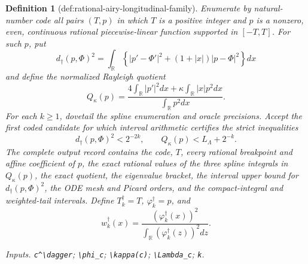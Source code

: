 \documentclass{article}
\newtheorem{definition}{Definition}
\begin{document}
\begin{definition}[def:rational-airy-longitudinal-family]
Enumerate by natural-number code all pairs \((T,p)\) in which \(T\) is a positive integer and \(p\) is a nonzero, even, continuous rational piecewise-linear function supported in \([-T,T]\).  For such \(p\), put
\[
d_\dagger(p,\Phi)^2=
\int_{\mathbb R}\left\{|p'-\Phi'|^2+(1+|x|)|p-\Phi|^2\right\}dx
\]
and define the normalized Rayleigh quotient
\[
Q_\kappa(p)=
\frac{4\int_{\mathbb R}|p'|^2dx+
\kappa\int_{\mathbb R}|x|p^2dx}
{\int_{\mathbb R}p^2dx}.
\]
For each \(k\ge1\), dovetail the spline enumeration and oracle precisions.  Accept the first coded candidate for which interval arithmetic certifies the strict inequalities
\[
d_\dagger(p,\Phi)^2<2^{-2k},
\qquad Q_\kappa(p)<L_\Lambda+2^{-k}.
\]
The complete output record contains the code, \(T\), every rational breakpoint and affine coefficient of \(p\), the exact rational values of the three spline integrals in \(Q_\kappa(p)\), the exact quotient, the eigenvalue bracket, the interval upper bound for \(d_\dagger(p,\Phi)^2\), the ODE mesh and Picard orders, and the compact-integral and weighted-tail intervals.  Define \(T_k^\dagger=T\), \(\varphi_k^\dagger=p\), and
\[
w_k^\dagger(x)=
\frac{(\varphi_k^\dagger(x))^2}
{\int_{\mathbb R}(\varphi_k^\dagger(z))^2dz}.
\]
\par\smallskip\noindent\emph{Inputs.} \texttt{c\textasciicircum{}\textbackslash{}\allowbreak{}dagger}; \texttt{\textbackslash{}\allowbreak{}phi\_\allowbreak{}c}; \texttt{\textbackslash{}\allowbreak{}kappa(c)}; \texttt{\textbackslash{}\allowbreak{}Lambda\_\allowbreak{}c}; \texttt{k}.
\end{definition}
\end{document}
